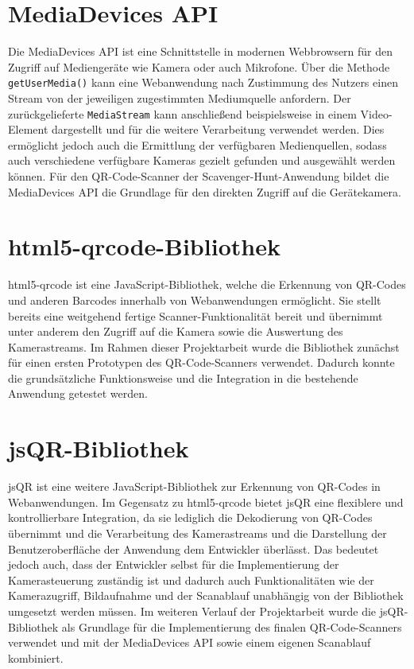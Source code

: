 ﻿\documentclass[oneside]{ausarbeitung}
\begin{document}
\autocite{jsQrDocs,html5QrcodeDocs}


\section{MediaDevices API}
\label{sec:mediadevices-api}

Die MediaDevices API ist eine Schnittstelle in modernen Webbrowsern für den Zugriff auf Mediengeräte wie Kamera oder auch Mikrofone. Über die Methode 
\texttt{getUserMedia()} kann eine Webanwendung nach Zustimmung des Nutzers einen Stream von der jeweiligen zugestimmten Mediumquelle anfordern. Der 
zurückgelieferte \texttt{MediaStream} kann anschließend beispielsweise in einem Video-Element dargestellt und für die weitere Verarbeitung verwendet 
werden. Dies ermöglicht jedoch auch die Ermittlung der verfügbaren Medienquellen, sodass auch verschiedene verfügbare Kameras gezielt gefunden und 
ausgewählt werden können. Für den QR-Code-Scanner der Scavenger-Hunt-Anwendung bildet die MediaDevices API die Grundlage für den direkten Zugriff auf 
die Gerätekamera.

\autocite{mdnGetUserMedia,mdnEnumerateDevices,mdnFacingMode,mdnMediaStreamTrackStop}


\section{html5-qrcode-Bibliothek}
\label{sec:html5-qrcode-bibliothek}

html5-qrcode ist eine JavaScript-Bibliothek, welche die Erkennung von QR-Codes und anderen Barcodes innerhalb von Webanwendungen ermöglicht. Sie stellt 
bereits eine weitgehend fertige Scanner-Funktionalität bereit und übernimmt unter anderem den Zugriff auf die Kamera sowie die Auswertung des 
Kamerastreams. Im Rahmen dieser Projektarbeit wurde die Bibliothek zunächst für einen ersten Prototypen des QR-Code-Scanners verwendet. Dadurch konnte 
die grundsätzliche Funktionsweise und die Integration in die bestehende Anwendung getestet werden.

\autocite{html5QrcodeDocs}


\section{jsQR-Bibliothek}
\label{sec:jsqr-bibliothek}

jsQR ist eine weitere JavaScript-Bibliothek zur Erkennung von QR-Codes in Webanwendungen. Im Gegensatz zu html5-qrcode bietet jsQR eine flexiblere und 
kontrollierbare Integration, da sie lediglich die Dekodierung von QR-Codes übernimmt und die Verarbeitung des Kamerastreams und die Darstellung der 
Benutzeroberfläche der Anwendung dem Entwickler überlässt. Das bedeutet jedoch auch, dass der Entwickler selbst für die Implementierung der 
Kamerasteuerung zuständig ist und dadurch auch Funktionalitäten wie der Kamerazugriff, Bildaufnahme und der Scanablauf unabhängig von der Bibliothek 
umgesetzt werden müssen. Im weiteren Verlauf der Projektarbeit wurde die jsQR-Bibliothek als Grundlage für die Implementierung des finalen 
QR-Code-Scanners verwendet und mit der MediaDevices API sowie einem eigenen Scanablauf kombiniert.
\end{document}
